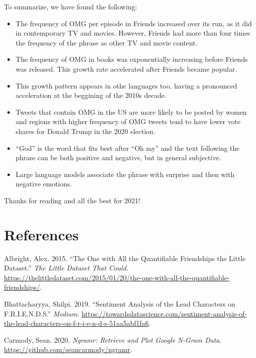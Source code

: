 \documentclass[]{article}
\begin{document}
To summarize, we have found the following:

\begin{itemize}
\item
  The frequency of OMG per episode in Friends increased over its run, as it did in contemporary TV and movies. However, Friends had more than four times the frequency of the phrase as other TV and movie content.
\item
  The frequency of OMG in books was exponentially increasing before Friends was released. This growth rate accelerated after Friends became popular.
\item
  This growth pattern appears in othe languages too, having a pronounced acceleration at the beggining of the 2010s decade.
\item
  Tweets that contain OMG in the US are more likely to be posted by women and regions with higher frequency of OMG tweets tend to have lower vote shares for Donald Trump in the 2020 election.
\item
  ``God'' is the word that fits best after ``Oh my'' and the text following the phrase can be both positive and negative, but in general subjective.
\item
  Large language models associate the phrase with surprise and then with negative emotions.
\end{itemize}

Thanks for reading and all the best for 2021!

\hypertarget{references}{%
\section*{References}\label{references}}

\hypertarget{refs}{}
\leavevmode\hypertarget{ref-Albright2015}{}%
Albright, Alex. 2015. ``The One with All the Quantifiable Friendships the Little Dataset.'' \emph{The Little Dataset That Could}. \url{https://thelittledataset.com/2015/01/20/the-one-with-all-the-quantifiable-friendships/}.

\leavevmode\hypertarget{ref-bhattacharyya_sentiment_2019}{}%
Bhattacharyya, Shilpi. 2019. ``Sentiment Analysis of the Lead Characters on F.R.I.E.N.D.S.'' \emph{Medium}. \url{https://towardsdatascience.com/sentiment-analysis-of-the-lead-characters-on-f-r-i-e-n-d-s-51aa5abf1fa6}.

\leavevmode\hypertarget{ref-ngramr}{}%
Carmody, Sean. 2020. \emph{Ngramr: Retrieve and Plot Google N-Gram Data}. \url{https://github.com/seancarmody/ngramr}.
\end{document}
